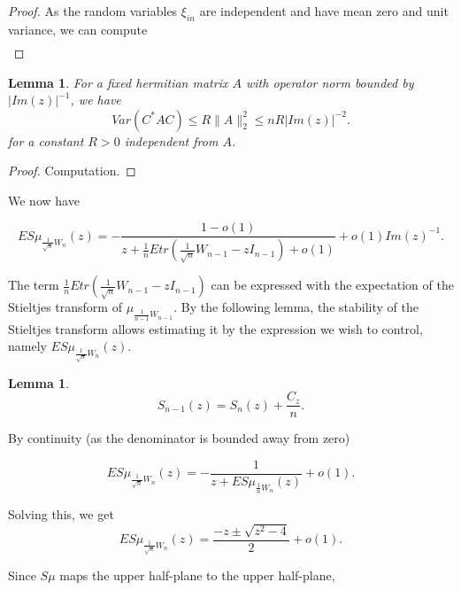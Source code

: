\documentclass[12pt,a4paper,leqno]{report}
\theoremstyle{plain}
\newtheorem{lem}[equation]{Lemma}
\theoremstyle{definition}
\theoremstyle{remark}
\begin{document}
\begin{proof}
As the random variables $\xi_{in}$ are independent and have mean zero and unit variance, we can compute
\begin{eqnarray*}

\end{eqnarray*} 
\end{proof}

\begin{lem}
For a fixed hermitian matrix $A$ with operator norm bounded by $|Im(z)|^{-1}$, we have
\begin{equation*}
Var(C^* A C) \leq R \| A \|_2^2 \leq n R |Im(z)|^{-2}.
\end{equation*}
for a constant $R>0$ independent from $A$.
\end{lem}

\begin{proof}
Computation.
\end{proof}

We now have

\begin{equation*}
ES\mu_{\frac{1}{\sqrt{n}}W_n}(z) = -\frac{1-o(1)}{z+\frac{1}{n}Etr(\frac{1}{\sqrt{n}}W_{n-1}-zI_{n-1}) + o(1)} + o(1)Im(z)^{-1}.
\end{equation*}

The term $\frac{1}{n}Etr(\frac{1}{\sqrt{n}}W_{n-1}-zI_{n-1})$ can be expressed with the expectation of the Stieltjes transform of $\mu_{\frac{1}{n-1}W_{n-1}}$. By the following lemma, the stability of the Stieltjes transform allows estimating it by 
the expression we wish to control, namely $ES\mu_{\frac{1}{\sqrt{n}}W_n}(z)$.

\begin{lem}
\begin{equation*}
S_{n-1}(z) = S_n(z) + \frac{C_z}{n}.
\end{equation*}
\end{lem}

By continuity (as the denominator is bounded away from zero) 

\begin{equation*}
ES\mu_{\frac{1}{\sqrt{n}}W_n}(z) = -\frac{1}{z+ES\mu_{\frac{1}{n}W_n}(z)} + o(1).
\end{equation*}

Solving this, we get
\begin{equation*}
ES\mu_{\frac{1}{\sqrt{n}}W_n}(z) = \frac{-z \pm \sqrt{z^2 - 4}}{2} +o(1).
\end{equation*}

Since $S\mu$ maps the upper half-plane to the upper half-plane,  
\end{document}
